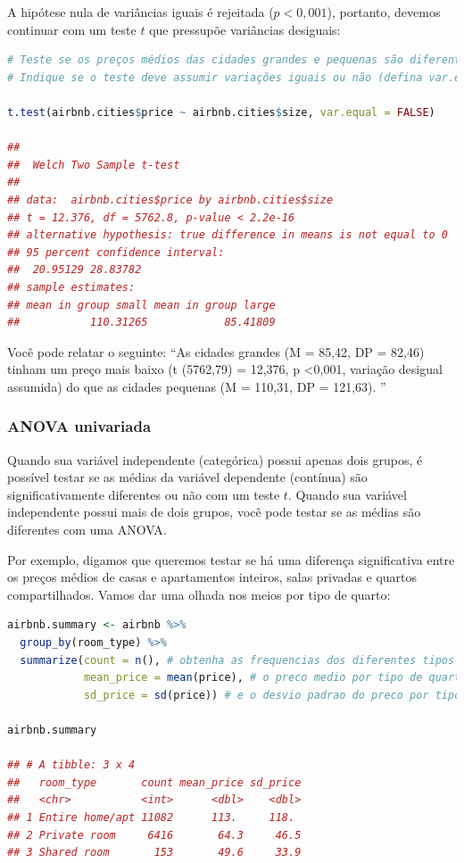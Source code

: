 \documentclass{article}
\begin{document}
A hipótese nula de variâncias iguais é rejeitada ($p <0,001$), portanto, devemos continuar com um teste $t$ que pressupõe variâncias desiguais:

\begin{lstlisting}[language=R]
# Teste se os preços médios das cidades grandes e pequenas são diferentes.
# Indique se o teste deve assumir variações iguais ou não (defina var.equal = TRUE para um teste que assume variações iguais).

t.test(airbnb.cities$price ~ airbnb.cities$size, var.equal = FALSE)

## 
##  Welch Two Sample t-test
## 
## data:  airbnb.cities$price by airbnb.cities$size
## t = 12.376, df = 5762.8, p-value < 2.2e-16
## alternative hypothesis: true difference in means is not equal to 0
## 95 percent confidence interval:
##  20.95129 28.83782
## sample estimates:
## mean in group small mean in group large 
##           110.31265            85.41809
\end{lstlisting}


Você pode relatar o seguinte: “As cidades grandes (M = 85,42, DP = 82,46) tinham um preço mais baixo (t (5762,79) = 12,376, p <0,001, variação desigual assumida) do que as cidades pequenas (M = 110,31, DP = 121,63). ”


\subsubsection{ANOVA univariada}

Quando sua variável independente (categórica) possui apenas dois grupos, é possível testar se as médias da variável dependente (contínua) são significativamente diferentes ou não com um teste $t$. Quando sua variável independente possui mais de dois grupos, você pode testar se as médias são diferentes com uma ANOVA.

Por exemplo, digamos que queremos testar se há uma diferença significativa entre os preços médios de casas e apartamentos inteiros, salas privadas e quartos compartilhados. Vamos dar uma olhada nos meios por tipo de quarto:

\begin{lstlisting}[language=R]
airbnb.summary <- airbnb %>% 
  group_by(room_type) %>% 
  summarize(count = n(), # obtenha as frequencias dos diferentes tipos de quartos 
            mean_price = mean(price), # o preco medio por tipo de quarto
            sd_price = sd(price)) # e o desvio padrao do preco por tipo de quarto

airbnb.summary

## # A tibble: 3 x 4
##   room_type       count mean_price sd_price
##   <chr>           <int>      <dbl>    <dbl>
## 1 Entire home/apt 11082      113.     118. 
## 2 Private room     6416       64.3     46.5
## 3 Shared room       153       49.6     33.9
\end{lstlisting}
\end{document}
